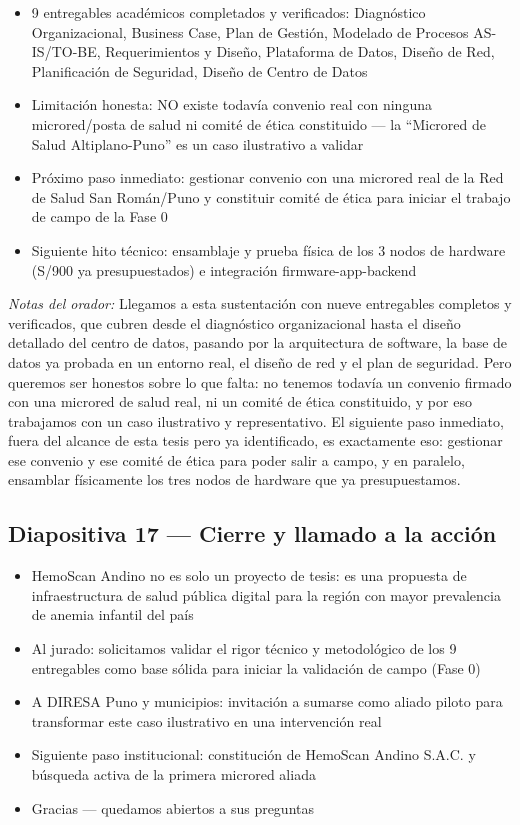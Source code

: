 \documentclass[11pt,a4paper]{article}
\providecommand{\tightlist}{%
  \setlength{\itemsep}{0pt}\setlength{\parskip}{0pt}}
\begin{document}
\begin{itemize}
\tightlist
\item
  9 entregables académicos completados y verificados: Diagnóstico Organizacional, Business Case, Plan de Gestión, Modelado de Procesos AS-IS/TO-BE, Requerimientos y Diseño, Plataforma de Datos, Diseño de Red, Planificación de Seguridad, Diseño de Centro de Datos
\item
  Limitación honesta: NO existe todavía convenio real con ninguna microred/posta de salud ni comité de ética constituido --- la ``Microred de Salud Altiplano-Puno'' es un caso ilustrativo a validar
\item
  Próximo paso inmediato: gestionar convenio con una microred real de la Red de Salud San Román/Puno y constituir comité de ética para iniciar el trabajo de campo de la Fase 0
\item
  Siguiente hito técnico: ensamblaje y prueba física de los 3 nodos de hardware (S/900 ya presupuestados) e integración firmware-app-backend
\end{itemize}

\emph{Notas del orador:} Llegamos a esta sustentación con nueve entregables completos y verificados, que cubren desde el diagnóstico organizacional hasta el diseño detallado del centro de datos, pasando por la arquitectura de software, la base de datos ya probada en un entorno real, el diseño de red y el plan de seguridad. Pero queremos ser honestos sobre lo que falta: no tenemos todavía un convenio firmado con una microred de salud real, ni un comité de ética constituido, y por eso trabajamos con un caso ilustrativo y representativo. El siguiente paso inmediato, fuera del alcance de esta tesis pero ya identificado, es exactamente eso: gestionar ese convenio y ese comité de ética para poder salir a campo, y en paralelo, ensamblar físicamente los tres nodos de hardware que ya presupuestamos.

\subsection{Diapositiva 17 --- Cierre y llamado a la acción}\label{diapositiva-17-cierre-y-llamado-a-la-acciuxf3n}

\begin{itemize}
\tightlist
\item
  HemoScan Andino no es solo un proyecto de tesis: es una propuesta de infraestructura de salud pública digital para la región con mayor prevalencia de anemia infantil del país
\item
  Al jurado: solicitamos validar el rigor técnico y metodológico de los 9 entregables como base sólida para iniciar la validación de campo (Fase 0)
\item
  A DIRESA Puno y municipios: invitación a sumarse como aliado piloto para transformar este caso ilustrativo en una intervención real
\item
  Siguiente paso institucional: constitución de HemoScan Andino S.A.C. y búsqueda activa de la primera microred aliada
\item
  Gracias --- quedamos abiertos a sus preguntas
\end{itemize}
\end{document}
